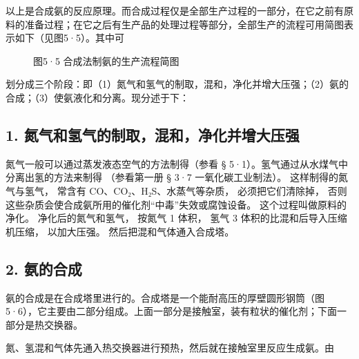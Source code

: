 以上是合成氨的反应原理。而合成过程仅是全部生产过程的一部分，在它之前有原料的准备过程；在它之后有生产品的处理过程等部分，全部生产的流程可用简图表示如下（见图5·5）。其中可

\begin{figure}
\centering
\caption{图5·5 合成法制氨的生产流程简图}
\end{figure}

划分成三个阶段：即（1）氮气和氢气的制取，混和，净化并增大压强；（2）氨的合成；（3）使氨液化和分离。现分述于下：

\subsection{1. 氮气和氢气的制取，混和，净化并增大压强}

氮气一般可以通过蒸发液态空气的方法制得（参看 §
5·1）。氢气通过从水煤气中分离出氢的方法来制得 （参看第一册 § 3·7
一氧化碳工业制法）。 这样制得的氮气与氢气， 常含有
CO、CO₂、H₂S、水蒸气等杂质， 必须把它们清除掉，
否则这些杂质会使合成氨所用的催化剂``中毒''失效或腐蚀设备。
这个过程叫做原料的净化。 净化后的氮气和氢气， 按氮气 1 体积， 氢气 3
体积的比混和后导入压缩机压缩， 以加大压强。 然后把混和气体通入合成塔。

\subsection{2. 氨的合成}

氨的合成是在合成塔里进行的。合成塔是一个能耐高压的厚壁圆形钢筒（图5·6），它主要由二部分组成。上面一部分是接触室，装有粒状的催化剂；下面一部分是热交换器。

氮、氢混和气体先通入热交换器进行预热，然后就在接触室里反应生成氨。由

